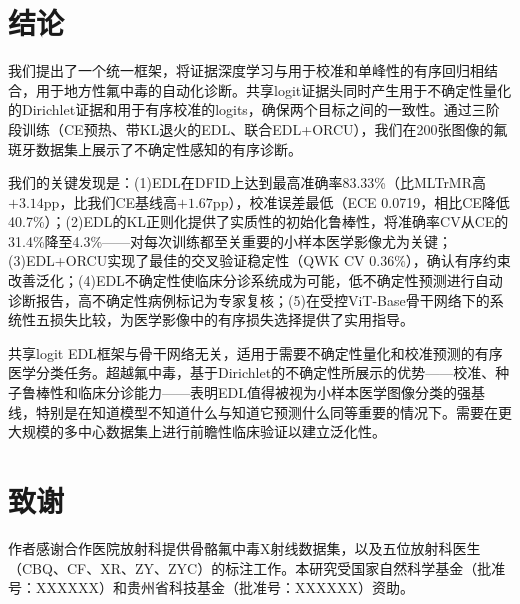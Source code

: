 \documentclass[12pt,a4paper]{ctexart}
\begin{document}
\section{结论}

我们提出了一个统一框架，将证据深度学习与用于校准和单峰性的有序回归相结合，用于地方性氟中毒的自动化诊断。共享logit证据头同时产生用于不确定性量化的Dirichlet证据和用于有序校准的logits，确保两个目标之间的一致性。通过三阶段训练（CE预热、带KL退火的EDL、联合EDL+ORCU），我们在200张图像的氟斑牙数据集上展示了不确定性感知的有序诊断。

我们的关键发现是：(1)EDL在DFID上达到最高准确率83.33\%（比MLTrMR高$+3.14$pp，比我们CE基线高$+1.67$pp），校准误差最低（ECE 0.0719，相比CE降低40.7\%）；(2)EDL的KL正则化提供了实质性的初始化鲁棒性，将准确率CV从CE的31.4\%降至4.3\%——对每次训练都至关重要的小样本医学影像尤为关键；(3)EDL+ORCU实现了最佳的交叉验证稳定性（QWK CV 0.36\%），确认有序约束改善泛化；(4)EDL不确定性使临床分诊系统成为可能，低不确定性预测进行自动诊断报告，高不确定性病例标记为专家复核；(5)在受控ViT-Base骨干网络下的系统性五损失比较，为医学影像中的有序损失选择提供了实用指导。

共享logit EDL框架与骨干网络无关，适用于需要不确定性量化和校准预测的有序医学分类任务。超越氟中毒，基于Dirichlet的不确定性所展示的优势——校准、种子鲁棒性和临床分诊能力——表明EDL值得被视为小样本医学图像分类的强基线，特别是在知道模型不知道什么与知道它预测什么同等重要的情况下。需要在更大规模的多中心数据集上进行前瞻性临床验证以建立泛化性。

\section*{致谢}
作者感谢合作医院放射科提供骨骼氟中毒X射线数据集，以及五位放射科医生（CBQ、CF、XR、ZY、ZYC）的标注工作。本研究受国家自然科学基金（批准号：XXXXXX）和贵州省科技基金（批准号：XXXXXX）资助。
\end{document}
